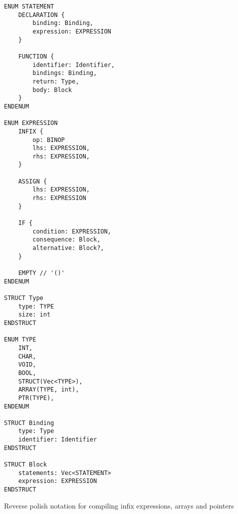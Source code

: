 \begin{lstlisting}
ENUM STATEMENT
    DECLARATION {
        binding: Binding, 
        expression: EXPRESSION
    }

    FUNCTION {
        identifier: Identifier,
        bindings: Binding,
        return: Type,
        body: Block
    }
ENDENUM

ENUM EXPRESSION 
    INFIX {
        op: BINOP 
        lhs: EXPRESSION,
        rhs: EXPRESSION,
    }

    ASSIGN {
        lhs: EXPRESSION,
        rhs: EXPRESSION
    }

    IF {
        condition: EXPRESSION,
        consequence: Block,
        alternative: Block?,
    }

    EMPTY // '()'
ENDENUM

STRUCT Type 
    type: TYPE
    size: int
ENDSTRUCT  

ENUM TYPE 
    INT,
    CHAR,
    VOID,
    BOOL,
    STRUCT(Vec<TYPE>),
    ARRAY(TYPE, int),
    PTR(TYPE),
ENDENUM

STRUCT Binding 
    type: Type 
    identifier: Identifier
ENDSTRUCT

STRUCT Block 
    statements: Vec<STATEMENT>
    expression: EXPRESSION 
ENDSTRUCT
\end{lstlisting}

Reverse polish notation for compiling infix expressions, arrays and pointers